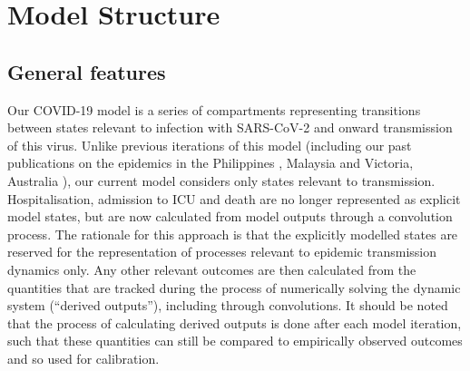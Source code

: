 
\section{Model Structure}

\subsection{General features}

Our COVID-19 model is a series of compartments representing transitions between states relevant to infection with SARS-CoV-2 and onward transmission of this virus.
Unlike previous iterations of this model (including our past publications on the epidemics in the Philippines \cite{caldwell-2021-a}, Malaysia \cite{jayasundara-2021} and Victoria, Australia \cite{trauer-2021-a}), our current model considers only states relevant to transmission.
Hospitalisation, admission to ICU and death are no longer represented as explicit model states, but are now calculated from model outputs through a convolution process.
The rationale for this approach is that the explicitly modelled states are reserved for the representation of processes relevant to epidemic transmission dynamics only.
Any other relevant outcomes are then calculated from the quantities that are tracked during the process of numerically solving the dynamic system (``derived outputs''), including through convolutions.
It should be noted that the process of calculating derived outputs is done after each model iteration, such that these quantities can still be compared to empirically observed outcomes and so used for calibration.

